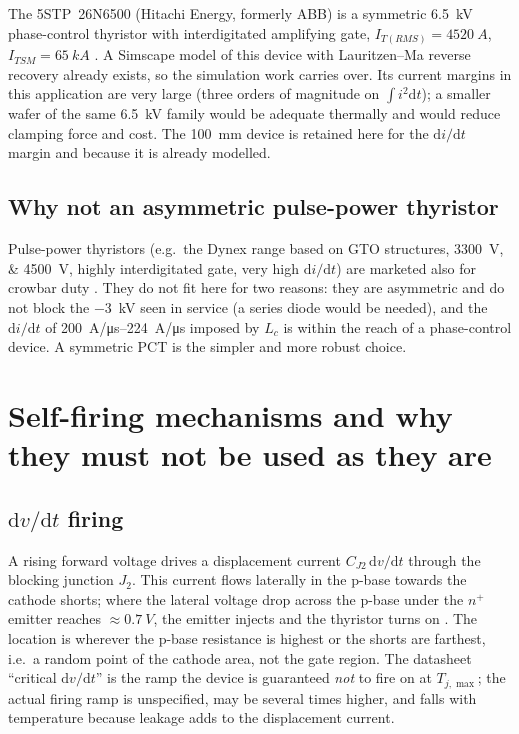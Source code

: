 \documentclass[11pt,a4paper]{article}
\begin{document}
The 5STP~26N6500 (Hitachi Energy, formerly ABB) is a symmetric \SI{6.5}{kV} phase-control
thyristor with interdigitated amplifying gate, $I_{T(RMS)} = \SI{4520}{A}$,
$I_{TSM} = \SI{65}{kA}$ \cite{ds26n6500}. A Simscape model of this device with Lauritzen--Ma
reverse recovery already exists, so the simulation work carries over. Its current margins in this
application are very large (three orders of magnitude on $\int i^2\mathrm{d}t$); a smaller wafer of
the same \SI{6.5}{kV} family would be adequate thermally and would reduce clamping force and cost.
The \SI{100}{mm} device is retained here for the $\mathrm{d}i/\mathrm{d}t$ margin and because it
is already modelled.

\subsection{Why not an asymmetric pulse-power thyristor}

Pulse-power thyristors (e.g.\ the Dynex range based on GTO structures, \SIlist{3300;4500}{V},
highly interdigitated gate, very high $\mathrm{d}i/\mathrm{d}t$) are marketed also for crowbar
duty \cite{dynexpp}. They do not fit here for two reasons: they are asymmetric and do not block
the \SI{-3}{kV} seen in service (a series diode would be needed), and the $\mathrm{d}i/\mathrm{d}t$
of \SIrange{200}{224}{A/\micro s} imposed by $L_c$ is within the reach of a phase-control device. A
symmetric PCT is the simpler and more robust choice.

\section{Self-firing mechanisms and why they must not be used as they are}
\label{sec:selffire}

\subsection{$\mathrm{d}v/\mathrm{d}t$ firing}

A rising forward voltage drives a displacement current $C_{J2}\,\mathrm{d}v/\mathrm{d}t$ through
the blocking junction $J_2$. This current flows laterally in the p-base towards the cathode
shorts; where the lateral voltage drop across the p-base under the $n^+$ emitter reaches
$\approx \SI{0.7}{V}$, the emitter injects and the thyristor turns on \cite{baliga}. The
location is wherever the p-base resistance is highest or the shorts are farthest, i.e.\ a random
point of the cathode area, not the gate region. The datasheet ``critical $\mathrm{d}v/\mathrm{d}t$''
is the ramp the device is guaranteed \emph{not} to fire on at $T_{j,\max}$; the actual firing
ramp is unspecified, may be several times higher, and falls with temperature because leakage adds
to the displacement current.
\end{document}

